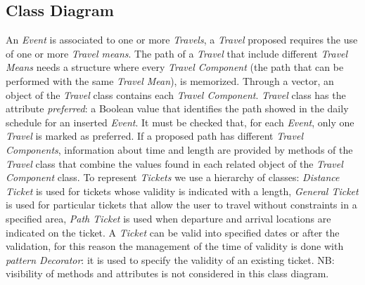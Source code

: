 \subsection{Class Diagram}
\label{subsec:Class Diagram}
\noindent{}
\newline
An \textit{Event} is associated to one or more \textit{Travels}, a \textit{Travel} proposed requires the use of one or more \textit{Travel means}. The path of a \textit{Travel} that include different \textit{Travel Means} needs a structure where every \textit{Travel Component} (the path that can be performed with the same \textit{Travel Mean}), is memorized. Through a vector, an object of the \textit{Travel} class contains each \textit{Travel Component}.
\newline
\newline
\textit{Travel} class has the attribute \textit{preferred}: a Boolean value that identifies the path showed in the daily schedule for an inserted \textit{Event}. It must be checked that, for each \textit{Event}, only one \textit{Travel} is marked as preferred.
\newline
If a proposed path has different \textit{Travel Components}, information about time and length are provided by methods of the \textit{Travel} class that combine the values found in each related object of the \textit{Travel Component} class.
\newline
\newline
To represent \textit{Tickets} we use a hierarchy of classes: \textit{Distance Ticket} is used for tickets whose validity is indicated with a length, \textit{General Ticket} is used for particular tickets that allow the user to travel without constraints in a specified area, \textit{Path Ticket} is used when departure and arrival locations are indicated on the ticket. 
\newline
A \textit{Ticket} can be valid into specified dates or after the validation, for this reason the management of the time of validity is done with \textit{pattern Decorator}: it is used to specify the validity of an existing ticket.
\newline
\newline
NB: visibility of methods and attributes is not considered in this class diagram.
